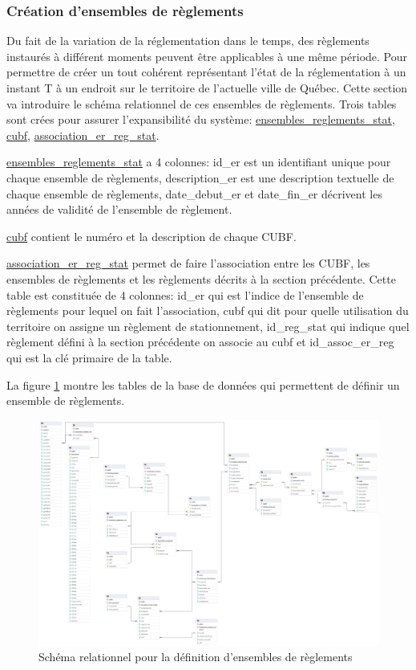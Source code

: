     \subsubsection{Création d'ensembles de règlements}
    Du fait de la variation de la réglementation dans le temps, des règlements instaurés à différent moments peuvent être applicables à une même période. Pour permettre de créer un tout cohérent représentant l'état de la réglementation à un instant T à un endroit sur le territoire de l'actuelle ville de Québec. Cette section va introduire le schéma relationnel de ces ensembles de règlements. Trois tables sont crées pour assurer l'expansibilité du système: \underline{ensembles\_reglements\_stat}, \underline{cubf}, \underline{association\_er\_reg\_stat}.\par
    \underline{ensembles\_reglements\_stat} a 4 colonnes: id\_er est un identifiant unique pour chaque ensemble de règlements, description\_er est une description textuelle de chaque ensemble de règlements, date\_debut\_er et date\_fin\_er décrivent les années de validité de l'ensemble de règlement.\par
    \underline{cubf} contient le numéro et la description de chaque \acf{CUBF}.\par
    \underline{association\_er\_reg\_stat} permet de faire l'association entre les \ac{CUBF}, les ensembles de règlements et les règlements décrits à la section précédente. Cette table est constituée de 4 colonnes: id\_er qui est l'indice de l'ensemble de règlements pour lequel on fait l'association, cubf qui dit pour quelle utilisation du territoire on assigne un règlement de stationnement, id\_reg\_stat qui indique quel règlement défini à la section précédente on associe au cubf et id\_assoc\_er\_reg qui est la clé primaire de la table.\par
    La figure \ref{fig:offstreet_db_erd_rulesets} montre les tables de la base de données qui permettent de définir un ensemble de règlements.
    \begin{figure}[h]
        \centering
        \includegraphics[trim={15cm 37.5cm 55cm 22.5cm},clip,width=12.5cm]{images/structure_base_de_donnee.png}
        \caption{Schéma relationnel pour la définition d'ensembles de règlements}
        \label{fig:offstreet_db_erd_rulesets}
    \end{figure}
    \FloatBarrier

